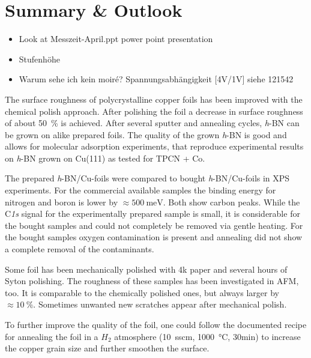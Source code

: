 \section{Summary \& Outlook}
  \begin{itemize}
	\item Look at Messzeit-April.ppt power point presentation
	\item Stufenh\"ohe
	\item Warum sehe ich kein moir\'e? Spannungsabhängigkeit [4V/1V] siehe 121542
\end{itemize}

The surface roughness of polycrystalline copper foils has been improved with the chemical polish approach. After polishing the foil a decrease in surface roughness of about \SI{50}{\percent} is achieved. After several sputter and annealing cycles, \textit{h}-BN can be grown on alike prepared foils. The quality of the grown \textit{h}-BN is good and allows for molecular adsorption experiments, that reproduce experimental results on \textit{h}-BN grown on Cu(111) as tested for TPCN + Co.

The prepared \textit{h}-BN/Cu-foils were compared to bought \textit{h}-BN/Cu-foils in XPS experiments. For the commercial available samples the binding energy for nitrogen and boron is lower by $\approx \SI{500}{\milli \eV}$. Both show carbon peaks. While the C\textit{1s} signal for the experimentally prepared sample is small, it is considerable for the bought samples and could not completely be removed via gentle heating. For the bought samples oxygen contamination is present and annealing did not show a complete removal of the contaminants.

Some foil has been mechanically polished with 4k paper and several hours of Syton polishing. The roughness of these samples has been investigated in AFM, too. It is comparable to the chemically polished ones, but always larger by $\approx \SI{10}{\percent}$. Sometimes unwanted new scratches appear after mechanical polish.

To further improve the quality of the foil, one could follow the documented recipe for annealing the foil in a $H_2$ atmosphere (\SI{10}{sscm}, \SI{1000}{\celsius}, 30min)\cite{kim_synthesis_2012} to increase the copper grain size and further smoothen the surface. 